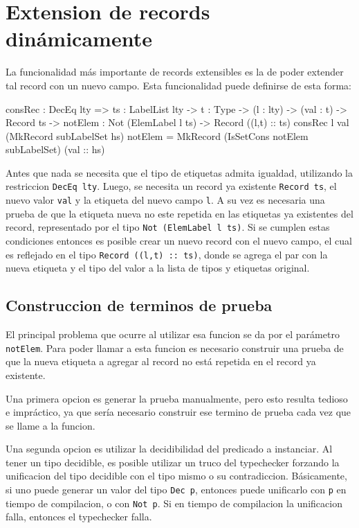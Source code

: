 \section{Extension de records dinámicamente}

La funcionalidad más importante de records extensibles es la de poder extender tal record con un nuevo campo. Esta funcionalidad puede definirse de esta forma:

\begin{code}
consRec : DecEq lty => {ts : LabelList lty} -> 
  {t : Type} -> (l : lty) -> (val : t) ->
  Record ts -> {notElem : Not (ElemLabel l ts)} -> 
  Record ((l,t) :: ts)
consRec l val (MkRecord subLabelSet hs) {notElem} = 
    MkRecord (IsSetCons notElem subLabelSet) (val :: hs)
\end{code}

Antes que nada se necesita que el tipo de etiquetas admita igualdad, utilizando la restriccion \texttt{DecEq lty}. Luego, se necesita un record ya existente \texttt{Record ts}, el nuevo valor \texttt{val} y la etiqueta del nuevo campo \texttt{l}. A su vez es necesaria una prueba de que la etiqueta nueva no este repetida en las etiquetas ya existentes del record, representado por el tipo \texttt{Not (ElemLabel l ts)}. Si se cumplen estas condiciones entonces es posible crear un nuevo record con el nuevo campo, el cual es reflejado en el tipo \texttt{Record ((l,t) :: ts)}, donde se agrega el par con la nueva etiqueta y el tipo del valor a la lista de tipos y etiquetas original.

\subsection{Construccion de terminos de prueba}

El principal problema que ocurre al utilizar esa funcion se da por el parámetro \texttt{notElem}. Para poder llamar a esta funcion es necesario construir una prueba de que la nueva etiqueta a agregar al record no está repetida en el record ya existente.

Una primera opcion es generar la prueba manualmente, pero esto resulta tedioso e impráctico, ya que sería necesario construir ese termino de prueba cada vez que se llame a la funcion.

Una segunda opcion es utilizar la decidibilidad del predicado a instanciar. Al tener un tipo decidible, es posible utilizar un truco del typechecker forzando la unificacion del tipo decidible con el tipo mismo o su contradiccion.
Básicamente, si uno puede generar un valor del tipo \texttt{Dec p}, entonces puede unificarlo con \texttt{p} en tiempo de compilacion, o con \texttt{Not p}. Si en tiempo de compilacion la unificacion falla, entonces el typechecker falla.

